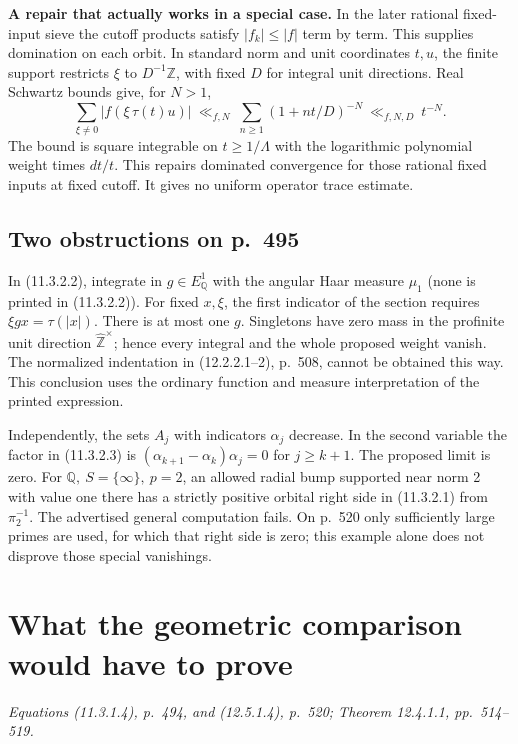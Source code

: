 \documentclass[11pt,reqno]{amsart}
\numberwithin{equation}{section}
\newcommand{\Q}{\mathbb Q}\newcommand{\R}{\mathbb R}\newcommand{\C}{\mathbb C}\newcommand{\Z}{\mathbb Z}
\begin{document}
\textbf{A repair that actually works in a special case.} In the later rational fixed-input sieve the cutoff products satisfy \(|f_k|\le |f|\) term by term. This supplies domination on each orbit. In standard norm and unit coordinates \(t,u\), the finite support restricts \(\xi\) to \(D^{-1}\Z\), with fixed \(D\) for integral unit directions. Real Schwartz bounds give, for \(N>1\),
\[
   \sum_{\xi\ne0}|f(\xi\,\tau(t)u)|\ \ll_{f,N}\ \sum_{n\ge1}(1+nt/D)^{-N}\ \ll_{f,N,D}\ t^{-N}.
\]
The bound is square integrable on \(t\ge1/\Lambda\) with the logarithmic polynomial weight times \(dt/t\). This repairs dominated convergence for those rational fixed inputs at fixed cutoff. It gives no uniform operator trace estimate.

\subsection*{Two obstructions on p.~495}
In (11.3.2.2), integrate in \(g\in E_\Q^1\) with the angular Haar measure \(\mu_1\) (none is printed in (11.3.2.2)). For fixed \(x,\xi\), the first indicator of the section requires \(\xi gx=\tau(|x|)\). There is at most one \(g\). Singletons have zero mass in the profinite unit direction \(\widehat{\Z}^{\times}\); hence every integral and the whole proposed weight vanish. The normalized indentation in (12.2.2.1--2), p.~508, cannot be obtained this way. This conclusion uses the ordinary function and measure interpretation of the printed expression.

Independently, the sets \(A_j\) with indicators \(\alpha_j\) decrease. In the second variable the factor in (11.3.2.3) is \((\alpha_{k+1}-\alpha_k)\alpha_j=0\) for \(j\ge k+1\). The proposed limit is zero. For \(\Q,\ S=\{\infty\},\ p=2\), an allowed radial bump supported near norm 2 with value one there has a strictly positive orbital right side in (11.3.2.1) from \(\pi_2^{-1}\). The advertised general computation fails. On p.~520 only sufficiently large primes are used, for which that right side is zero; this example alone does not disprove those special vanishings.


\section{What the geometric comparison would have to prove}\label{sec:9}

\textit{Equations (11.3.1.4), p.~494, and (12.5.1.4), p.~520; Theorem 12.4.1.1, pp.~514--519.}\par
\end{document}
